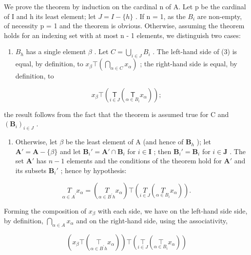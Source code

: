 We prove the theorem by induction on the cardinal n of A. Let p be the cardinal of I and h its least element; let \(J = I - \{h\}\) . If n = 1, as the \(B_{i}\) are non-empty, of necessity p = 1 and the theorem is obvious. Otherwise, assuming the theorem holds for an indexing set with at most n - 1 elements, we distinguish two cases:

\begin{enumerate}
\def\labelenumi{(\alph{enumi})}
\tightlist
\item
  \(B_{h}\) has a single element \(\beta\) . Let \(C = \bigcup_{i \in J} B_{i}\) . The left-hand side of (3) is equal, by definition, to \(x_{\beta} \top \left( \bigcap_{\alpha \in C} x_{\alpha} \right)\) ; the right-hand side is equal, by definition, to
\end{enumerate}

\[
x _ {\beta} \top \left(\underset {i \in J} {\mathsf {T}} \left(\underset {\alpha \in B _ {i}} {\mathsf {T}} x _ {\alpha}\right)\right);
\]

the result follows from the fact that the theorem is assumed true for C and \((\mathbf{B}_{i})_{i\in J}\) .

\begin{enumerate}
\def\labelenumi{(\alph{enumi})}
\setcounter{enumi}{1}
\tightlist
\item
  Otherwise, let \(\beta\) be the least element of A (and hence of \(\mathbf{B}_h\) ); let \(\mathbf{A}' = \mathbf{A} - \{\beta\}\) and let \(\mathbf{B}_i' = \mathbf{A}' \cap \mathbf{B}_i\) for \(i \in \mathbf{I}\) ; then \(\mathbf{B}_i' = \mathbf{B}_i\) for \(i \in \mathbf{J}\) . The set \(\mathbf{A}'\) has \(n - 1\) elements and the conditions of the theorem hold for \(\mathbf{A}'\) and its subsets \(\mathbf{B}_i'\) ; hence by hypothesis:
\end{enumerate}

\[
\underset {\alpha \in A ^ {\prime}} {T} x _ {\alpha} = \left(\underset {\alpha \in B ^ {\prime} h} {T} x _ {\alpha}\right) \top \left(\underset {i \in J} {T} \left(\underset {\alpha \in B _ {i}} {T} x _ {\alpha}\right)\right).
\]

Forming the composition of \(x_{\beta}\) with each side, we have on the left-hand side side, by definition, \(\bigcap_{\alpha \in A} x_{\alpha}\) and on the right-hand side, using the associativity,

\[
\left(x _ {\beta} \top \left(\underset {\alpha \in B ^ {\prime} h} {\top} x _ {\alpha}\right)\right) \top \left(\underset {i \in J} {\top} \left(\underset {\alpha \in B _ {i}} {\top} x _ {\alpha}\right)\right)
\]

